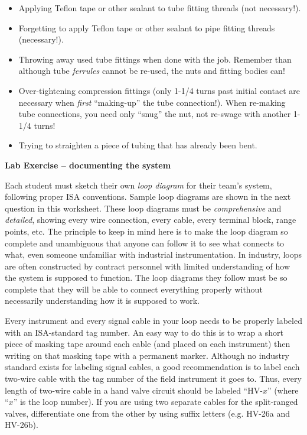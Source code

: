 \begin{itemize}
\item{} Applying Teflon tape or other sealant to tube fitting threads (not necessary!).
\item{} Forgetting to apply Teflon tape or other sealant to pipe fitting threads (necessary!).
\item{} Throwing away used tube fittings when done with the job.  Remember than although tube {\it ferrules} cannot be re-used, the nuts and fitting bodies can!
\item{} Over-tightening compression fittings (only 1-1/4 turns past initial contact are necessary when {\it first} ``making-up'' the tube connection!).  When re-making tube connections, you need only ``snug'' the nut, not re-swage with another 1-1/4 turns!
\item{} Trying to straighten a piece of tubing that has already been bent.
\end{itemize}






\vfil \eject

\noindent
{\bf Lab Exercise -- documenting the system}

\vskip 5pt

Each student must sketch their own {\it loop diagram} for their team's system, following proper ISA conventions.  Sample loop diagrams are shown in the next question in this worksheet.  These loop diagrams must be {\it comprehensive} and {\it detailed}, showing every wire connection, every cable, every terminal block, range points, etc.  The principle to keep in mind here is to make the loop diagram so complete and unambiguous that anyone can follow it to see what connects to what, even someone unfamiliar with industrial instrumentation.  In industry, loops are often constructed by contract personnel with limited understanding of how the system is supposed to function.  The loop diagrams they follow must be so complete that they will be able to connect everything properly without necessarily understanding how it is supposed to work.

Every instrument and every signal cable in your loop needs to be properly labeled with an ISA-standard tag number.  An easy way to do this is to wrap a short piece of masking tape around each cable (and placed on each instrument) then writing on that masking tape with a permanent marker.  Although no industry standard exists for labeling signal cables, a good recommendation is to label each two-wire cable with the tag number of the field instrument it goes to.  Thus, every length of two-wire cable in a hand valve circuit should be labeled ``HV-$x$'' (where ``$x$'' is the loop number).  If you are using two separate cables for the split-ranged valves, differentiate one from the other by using suffix letters (e.g. HV-26a and HV-26b).

